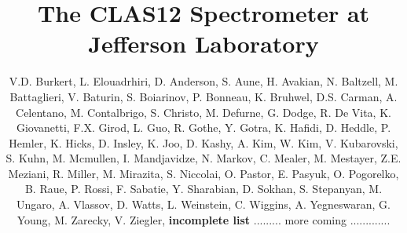 \documentclass[final,3p,twocolumn]{elsarticle}
\begin{document}
\begin{frontmatter}

  \title{The CLAS12 Spectrometer at Jefferson Laboratory}
\author{V.D. Burkert, L. Elouadrhiri, D. Anderson, S. Aune, H. Avakian, N. Baltzell, M. Battaglieri,  V. Baturin,
  S. Boiarinov, P. Bonneau, K. Bruhwel, D.S. Carman, A. Celentano, M. Contalbrigo, S. Christo, M. Defurne, G. Dodge,
  R. De Vita, K. Giovanetti, F.X. Girod, L. Guo, R. Gothe, Y. Gotra, K. Hafidi, D. Heddle, P. Hemler, K. Hicks, D. Insley, K. Joo,
  D. Kashy, A. Kim, W. Kim, V. Kubarovski, S. Kuhn, M. Mcmullen, I. Mandjavidze, N. Markov, C. Mealer, M. Mestayer,
  Z.E. Meziani, R. Miller, M. Mirazita, S. Niccolai, O. Pastor, E. Pasyuk, O. Pogorelko, B. Raue, P. Rossi, F. Sabatie,
  Y. Sharabian, D. Sokhan, S. Stepanyan, M. Ungaro, A. Vlassov, D. Watts, L. Weinstein, C. Wiggins, A. Yegneswaran, 
  G. Young, M. Zarecky, V. Ziegler, {\bf incomplete list} ......... more coming ............. }

\end{frontmatter}
\end{document}
